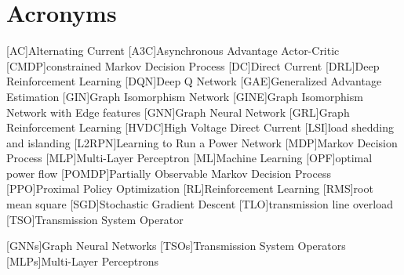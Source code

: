 \chapter*{Acronyms}


\begin{acronym}[XXXXX] 
    [AC]{Alternating Current}
    [A3C]{Asynchronous Advantage Actor-Critic}
    [CMDP]{constrained Markov Decision Process}
    [DC]{Direct Current}
    [DRL]{Deep Reinforcement Learning}
    [DQN]{Deep Q Network}
    [GAE]{Generalized Advantage Estimation}
    [GIN]{Graph Isomorphism Network}
    [GINE]{Graph Isomorphism Network with Edge features}
    [GNN]{Graph Neural Network}
    [GRL]{Graph Reinforcement Learning}
    [HVDC]{High Voltage Direct Current}
    [LSI]{load shedding and islanding}
    [L2RPN]{Learning to Run a Power Network}
    [MDP]{Markov Decision Process}
    [MLP]{Multi-Layer Perceptron}
    [ML]{Machine Learning}
    [OPF]{optimal power flow}
    [POMDP]{Partially Observable Markov Decision Process}
    [PPO]{Proximal Policy Optimization}
    [RL]{Reinforcement Learning}
    [RMS]{root mean square}
    [SGD]{Stochastic Gradient Descent}
    [TLO]{transmission line overload}
    [TSO]{Transmission System Operator}
\end{acronym}

[GNNs]{Graph Neural Networks}
[TSOs]{Transmission System Operators}
[MLPs]{Multi-Layer Perceptrons}



